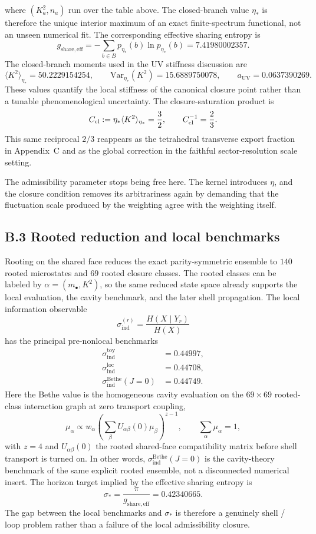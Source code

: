 \documentclass[11pt]{article}
\begin{document}
where $(K_a^2,n_a)$ run over the table above. The closed-branch value $\eta_*$ is therefore the unique interior maximum of an exact finite-spectrum functional, not an unseen numerical fit.
The corresponding effective sharing entropy is
\[
g_{\mathrm{share,eff}}
=
-\sum_{b\in B}p_{\eta_*}(b)\ln p_{\eta_*}(b)
=
7.41980002357.
\]
The closed-branch moments used in the UV stiffness discussion are
\[
\langle K^2\rangle_{\eta_*}=50.2229154254,
\qquad
\mathrm{Var}_{\eta_*}(K^2)=15.6889750078,
\qquad
a_{\mathrm{UV}}=0.0637390269.
\]
These values quantify the local stiffness of the canonical closure point rather than a tunable phenomenological uncertainty.
The closure-saturation product is
\[
C_{\rm cl}:=\eta_*\langle K^2\rangle_{\eta_*}=\frac32,
\qquad
C_{\rm cl}^{-1}=\frac23.
\]
This same reciprocal $2/3$ reappears as the tetrahedral transverse export fraction in Appendix~C and as the global correction in the faithful sector-resolution scale setting.

The admissibility parameter stops being free here. The kernel introduces $\eta$, and the closure condition removes its arbitrariness again by demanding that the fluctuation scale produced by the weighting agree with the weighting itself.

\subsection*{B.3 Rooted reduction and local benchmarks}

Rooting on the shared face reduces the exact parity-symmetric ensemble to $140$ rooted microstates and $69$ rooted closure classes. The rooted classes can be labeled by $\alpha=(m_\bullet,K^2)$, so the same reduced state space already supports the local evaluation, the cavity benchmark, and the later shell propagation. The local information observable
\[
\sigma_{\mathrm{ind}}^{(r)}=\frac{H(X\mid Y_r)}{H(X)}
\]
has the principal pre-nonlocal benchmarks
\begin{align}
\sigma_{\mathrm{ind}}^{\mathrm{toy}} &= 0.44997,\\
\sigma_{\mathrm{ind}}^{\mathrm{loc}} &= 0.44708,\\
\sigma_{\mathrm{ind}}^{\mathrm{Bethe}}(J=0) &= 0.44749.
\end{align}
Here the Bethe value is the homogeneous cavity evaluation on the $69\times 69$ rooted-class interaction graph at zero transport coupling,
\[
\mu_\alpha
\propto
w_\alpha
\left(\sum_\beta U_{\alpha\beta}(0)\mu_\beta\right)^{z-1},
\qquad
\sum_\alpha \mu_\alpha=1,
\]
with $z=4$ and $U_{\alpha\beta}(0)$ the rooted shared-face compatibility matrix before shell transport is turned on. In other words, $\sigma_{\mathrm{ind}}^{\mathrm{Bethe}}(J=0)$ is the cavity-theory benchmark of the same explicit rooted ensemble, not a disconnected numerical insert.
The horizon target implied by the effective sharing entropy is
\[
\sigma_*=\frac{\pi}{g_{\mathrm{share,eff}}}=0.42340665.
\]
The gap between the local benchmarks and $\sigma_*$ is therefore a genuinely shell / loop problem rather than a failure of the local admissibility closure.
\end{document}
